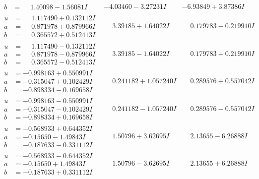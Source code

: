 \documentclass[1p]{elsarticle_modified}
\theoremstyle{definition}
\begin{document}
$$\begin{array}{c|c|c}
\begin{aligned}
b &= \phantom{-}1.40098 - 1.56081 I\end{aligned}
 & -4.03460 - 3.27231 I & -6.93849 + 3.87386 I \\ \hline\begin{aligned}
u &= \phantom{-}1.117490 + 0.132112 I \\
a &= \phantom{-}0.871978 + 0.879966 I \\
b &= \phantom{-}0.365572 + 0.512413 I\end{aligned}
 & \phantom{-}3.39185 + 1.64022 I & \phantom{-}0.179783 - 0.219910 I \\ \hline\begin{aligned}
u &= \phantom{-}1.117490 - 0.132112 I \\
a &= \phantom{-}0.871978 - 0.879966 I \\
b &= \phantom{-}0.365572 - 0.512413 I\end{aligned}
 & \phantom{-}3.39185 - 1.64022 I & \phantom{-}0.179783 + 0.219910 I \\ \hline\begin{aligned}
u &= -0.998163 + 0.550991 I \\
a &= -0.315047 + 0.102429 I \\
b &= -0.898334 - 0.169658 I\end{aligned}
 & \phantom{-}0.241182 + 1.057240 I & \phantom{-}0.289576 + 0.557042 I \\ \hline\begin{aligned}
u &= -0.998163 - 0.550991 I \\
a &= -0.315047 - 0.102429 I \\
b &= -0.898334 + 0.169658 I\end{aligned}
 & \phantom{-}0.241182 - 1.057240 I & \phantom{-}0.289576 - 0.557042 I \\ \hline\begin{aligned}
u &= -0.568933 + 0.644352 I \\
a &= -0.15650 - 1.49843 I \\
b &= -0.187633 - 0.331112 I\end{aligned}
 & \phantom{-}1.50796 + 3.62695 I & \phantom{-}2.13655 - 6.26888 I \\ \hline\begin{aligned}
u &= -0.568933 - 0.644352 I \\
a &= -0.15650 + 1.49843 I \\
b &= -0.187633 + 0.331112 I\end{aligned}
 & \phantom{-}1.50796 - 3.62695 I & \phantom{-}2.13655 + 6.26888 I \\ \hline\begin{aligned}

\end{aligned}
\end{array}$$
\end{document}
